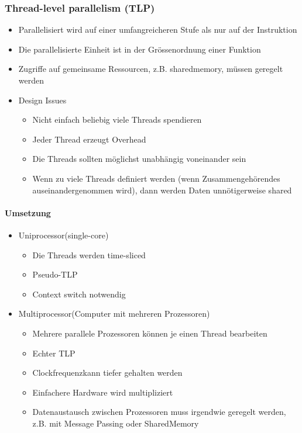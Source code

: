 \begin{multicols}{2}
\subsubsection{Thread-level parallelism (TLP)}
\begin{itemize}
	\item Parallelisiert wird auf einer umfangreicheren Stufe als nur auf der Instruktion 
	\item Die parallelisierte Einheit ist in der Grössenordnung einer Funktion 
	\item Zugriffe auf gemeinsame Ressourcen, z.B. sharedmemory, müssen geregelt werden 
	\item Design Issues 
	\begin{itemize}
		\item Nicht einfach beliebig viele Threads spendieren 
		\item Jeder Thread erzeugt Overhead 
		\item Die Threads sollten möglichst unabhängig voneinander sein
		\item Wenn zu viele Threads definiert werden (wenn Zusammengehörendes auseinandergenommen wird), dann werden Daten unnötigerweise shared
	\end{itemize}		
\end{itemize}
\columnbreak
\paragraph{Umsetzung}
\begin{itemize}
	\item Uniprocessor(single-core) 
	\begin{itemize}
		\item Die Threads werden time-sliced 
		\item Pseudo-TLP
		\item Context switch notwendig
	\end{itemize}
	\item  Multiprocessor(Computer mit mehreren Prozessoren) 
	\begin{itemize}
		\item Mehrere parallele Prozessoren können je einen Thread bearbeiten 
		\item Echter TLP 
		\item Clockfrequenzkann tiefer gehalten werden 
		\item Einfachere Hardware wird multipliziert 
		\item Datenaustausch zwischen Prozessoren muss irgendwie geregelt werden, z.B. mit Message Passing oder SharedMemory
	\end{itemize}
\end{itemize}
\end{multicols}

